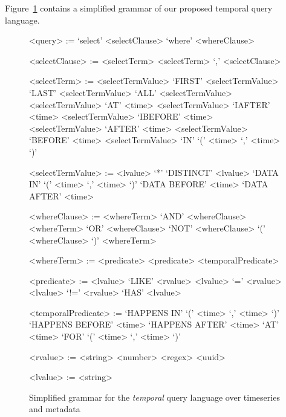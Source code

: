 Figure~\ref{fig:temporalgrammar} contains a simplified grammar of our proposed temporal query language.

\setlength{\grammarindent}{8em}
\setlength{\grammarparsep}{4pt}
\begin{figure}
\centering
\begin{grammar}
<query> := `select' <selectClause> `where' <whereClause>

<selectClause> := <selectTerm>
\alt <selectTerm> `,' <selectClause>

<selectTerm> := <selectTermValue>
\alt `FIRST' <selectTermValue>
\alt `LAST' <selectTermValue>
\alt `ALL' <selectTermValue>
\alt <selectTermValue> `AT' <time>
\alt <selectTermValue> `IAFTER' <time>
\alt <selectTermValue> `IBEFORE' <time>
\alt <selectTermValue> `AFTER' <time>
\alt <selectTermValue> `BEFORE' <time>
\alt <selectTermValue> `IN' `(' <time> `,' <time> `)'

<selectTermValue> := <lvalue>
\alt `*'
\alt `DISTINCT' <lvalue>
\alt `DATA IN' `(' <time> `,' <time> `)'
\alt `DATA BEFORE' <time>
\alt `DATA AFTER' <time>

<whereClause> := <whereTerm> `AND' <whereClause>
\alt <whereTerm> `OR' <whereClause>
\alt `NOT' <whereClause>
\alt `(' <whereClause> `)'
\alt <whereTerm>

<whereTerm> := <predicate>
\alt <predicate> <temporalPredicate>

<predicate> := <lvalue> `LIKE' <rvalue>
\alt <lvalue> `=' <rvalue>
\alt <lvalue> `!=' <rvalue>
\alt `HAS' <lvalue>

<temporalPredicate> := `HAPPENS IN' `(' <time> `,' <time> `)'
\alt `HAPPENS BEFORE' <time>
\alt `HAPPENS AFTER' <time>
\alt `AT' <time>
\alt `FOR' `(' <time> `,' <time> `)'

<rvalue> := <string>
\alt <number>
\alt <regex>
\alt <uuid>

<lvalue> := <string>
\end{grammar}
\caption{Simplified grammar for the \emph{temporal} query language over timeseries and metadata}
\label{fig:temporalgrammar}
\end{figure}


